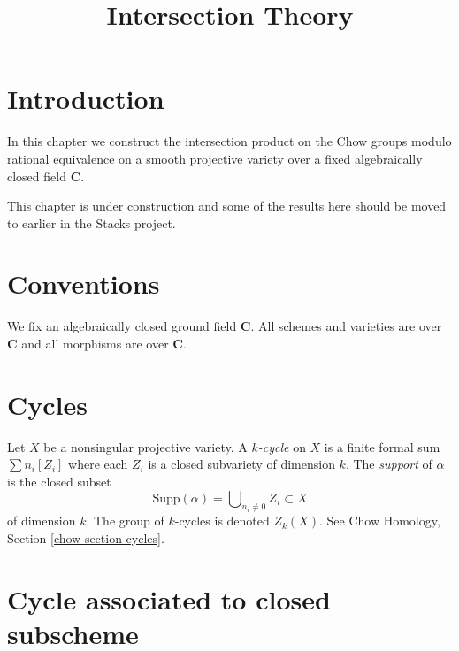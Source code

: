 

%


\title{Intersection Theory}


\maketitle

\label{section-phantom}

\tableofcontents


\section{Introduction}
\label{section-introduction}

\noindent
In this chapter we construct the intersection product on the
Chow groups modulo rational equivalence on a smooth projective
variety over a fixed algebraically closed field $\mathbf{C}$.

\medskip\noindent
This chapter is under construction and some of the results here
should be moved to earlier in the Stacks project.


\section{Conventions}
\label{section-conventions}

\noindent
We fix an algebraically closed ground field $\mathbf{C}$.
All schemes and varieties are over $\mathbf{C}$ and all
morphisms are over $\mathbf{C}$.


\section{Cycles}
\label{section-cycles}

\noindent
Let $X$ be a nonsingular projective variety.
A {\it $k$-cycle} on $X$ is a finite formal sum $\sum n_i [Z_i]$
where each $Z_i$ is a closed subvariety of dimension $k$.
The {\it support} of $\alpha$ is the closed subset
$$
\text{Supp}(\alpha) = \bigcup\nolimits_{n_i \not = 0} Z_i \subset X
$$
of dimension $k$. The group of $k$-cycles is denoted $Z_k(X)$.
See Chow Homology, Section \ref{chow-section-cycles}.


\section{Cycle associated to closed subscheme}
\label{section-cycle-of-closed}

